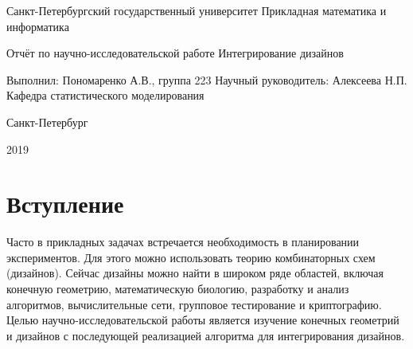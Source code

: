 \documentclass[12pt]{article}
\begin{document}
    \Large
    \begin{center}
        Санкт-Петербургский государственный университет\newline
        Прикладная математика и информатика\newline\newline\newline\newline\newline\newline
    \end{center}
    \begin{center}
        Отчёт по научно-исследовательской работе\newline
        Интегрирование дизайнов\newline\newline\newline\newline\newline
    \end{center}

    \hspace*{55mm}Выполнил:\newline
    \hspace*{61mm}Пономаренко А.В., группа 223\newline
    \hspace*{61mm}Научный руководитель:\newline
    \hspace*{61mm}Алексеева Н.П.\newline
    \hspace*{61mm}Кафедра статистического моделирования\newline\newline\newline\newline\newline\newline\newline
    \begin{center}
        Санкт-Петербург

        2019
    \end{center}
    \normalsize
    \newpage


    \section{Вступление}
    Часто в прикладных задачах встречается необходимость в планировании экспериментов. Для этого можно использовать теорию комбинаторных схем (дизайнов). Сейчас дизайны можно найти в широком ряде областей, включая конечную геометрию, математическую биологию, разработку и анализ алгоритмов, вычислительные сети, групповое тестирование и криптографию.\newline\newline
    Целью научно-исследовательской работы является изучение конечных геометрий и дизайнов с последующей реализацией алгоритма для интегрирования дизайнов.
\end{document}
